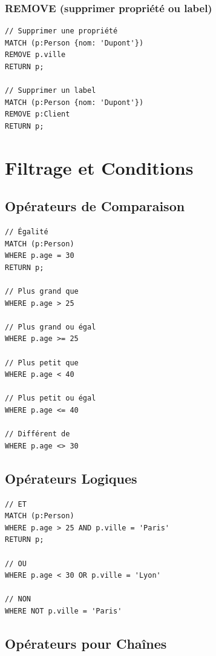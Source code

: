 \documentclass[11pt,a4paper]{article}
\begin{document}
\subsubsection{REMOVE (supprimer propriété ou label)}

\begin{lstlisting}
// Supprimer une propriété
MATCH (p:Person {nom: 'Dupont'})
REMOVE p.ville
RETURN p;

// Supprimer un label
MATCH (p:Person {nom: 'Dupont'})
REMOVE p:Client
RETURN p;
\end{lstlisting}

\newpage

\section{Filtrage et Conditions}

\subsection{Opérateurs de Comparaison}

\begin{lstlisting}
// Égalité
MATCH (p:Person)
WHERE p.age = 30
RETURN p;

// Plus grand que
WHERE p.age > 25

// Plus grand ou égal
WHERE p.age >= 25

// Plus petit que
WHERE p.age < 40

// Plus petit ou égal
WHERE p.age <= 40

// Différent de
WHERE p.age <> 30
\end{lstlisting}

\subsection{Opérateurs Logiques}

\begin{lstlisting}
// ET
MATCH (p:Person)
WHERE p.age > 25 AND p.ville = 'Paris'
RETURN p;

// OU
WHERE p.age < 30 OR p.ville = 'Lyon'

// NON
WHERE NOT p.ville = 'Paris'
\end{lstlisting}

\subsection{Opérateurs pour Chaînes}
\end{document}
